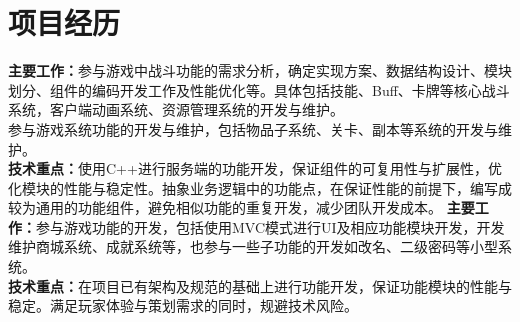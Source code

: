\documentclass[11pt,a4paper,sans,english]{moderncv}        %
\begin{document}
\section{项目经历}
{\textbf{主要工作：}{参与游戏中战斗功能的需求分析，确定实现方案、数据结构设计、模块划分、组件的编码开发工作及性能优化等。具体包括技能、Buff、卡牌等核心战斗系统，客户端动画系统、资源管理系统的开发与维护。\\参与游戏系统功能的开发与维护，包括物品子系统、关卡、副本等系统的开发与维护。 }
\\\textbf{技术重点：}使用C++进行服务端的功能开发，保证组件的可复用性与扩展性，优化模块的性能与稳定性。抽象业务逻辑中的功能点，在保证性能的前提下，编写成较为通用的功能组件，避免相似功能的重复开发，减少团队开发成本。}
{\textbf{主要工作：}参与游戏功能的开发，包括使用MVC模式进行UI及相应功能模块开发，开发维护商城系统、成就系统等，也参与一些子功能的开发如改名、二级密码等小型系统。
\\\textbf{技术重点：}在项目已有架构及规范的基础上进行功能开发，保证功能模块的性能与稳定。满足玩家体验与策划需求的同时，规避技术风险。}
\textbf{\\}
\clearpage
\end{document}
